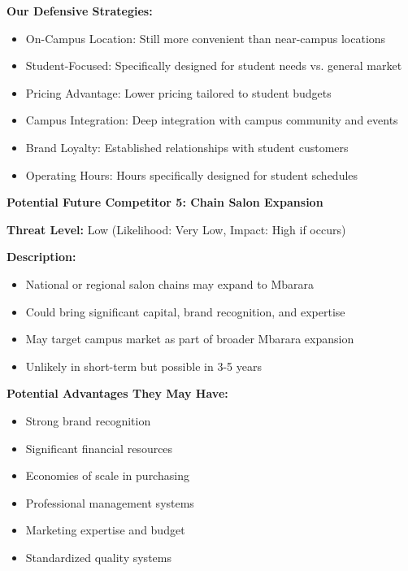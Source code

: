 \textbf{Our Defensive Strategies:}
\begin{itemize}[leftmargin=2em]
    \item On-Campus Location: Still more convenient than near-campus locations
    \item Student-Focused: Specifically designed for student needs vs. general market
    \item Pricing Advantage: Lower pricing tailored to student budgets
    \item Campus Integration: Deep integration with campus community and events
    \item Brand Loyalty: Established relationships with student customers
    \item Operating Hours: Hours specifically designed for student schedules
\end{itemize}

\vspace{1em}

\textbf{Potential Future Competitor 5: Chain Salon Expansion}

\textbf{Threat Level:} Low (Likelihood: Very Low, Impact: High if occurs)

\textbf{Description:}
\begin{itemize}[leftmargin=2em]
    \item National or regional salon chains may expand to Mbarara
    \item Could bring significant capital, brand recognition, and expertise
    \item May target campus market as part of broader Mbarara expansion
    \item Unlikely in short-term but possible in 3-5 years
\end{itemize}

\textbf{Potential Advantages They May Have:}
\begin{itemize}[leftmargin=2em]
    \item Strong brand recognition
    \item Significant financial resources
    \item Economies of scale in purchasing
    \item Professional management systems
    \item Marketing expertise and budget
    \item Standardized quality systems
\end{itemize}

